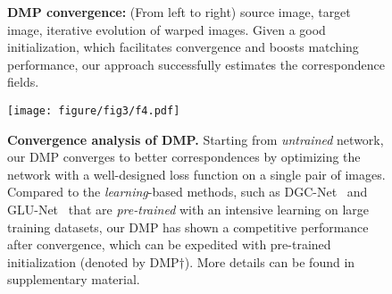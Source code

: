 \documentclass[10pt,twocolumn,letterpaper]{article}
\begin{document}
\begin{figure*}[t]
		\centering
		\renewcommand{\thesubfigure}{}
\hfill
		\hfill
		\hfill
		\hfill
		\hfill
		\hfill
		\hfill
		\hfill
		\vspace{-10pt}
		\caption{\textbf{DMP convergence:} (From left to right) source image, target image, iterative evolution of warped images. Given a good initialization, which facilitates convergence and boosts matching performance, our approach successfully estimates the correspondence fields.}\vspace{-10pt}\label{img:3}
\end{figure*}

\begin{figure}
	\centering
\texttt{[image: figure/fig3/f4.pdf]}
  \caption{\textbf{Convergence analysis of DMP.} Starting from \emph{untrained} network, our DMP converges to better correspondences by optimizing the network with a well-designed loss function on a single pair of images. Compared to the \emph{learning}-based methods, such as DGC-Net~\cite{melekhov2019dgc} and GLU-Net~\cite{truong2020glu} that are \emph{pre-trained} with an intensive learning on large training datasets, our DMP has shown a competitive performance after convergence, which can be expedited with pre-trained initialization (denoted by DMP$\dagger$). More details can be found in supplementary material.}\vspace{-15pt}\label{img:4}
\end{figure}
\end{document}
